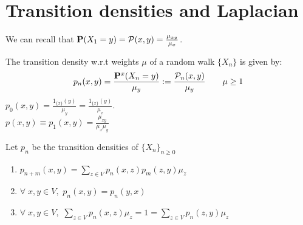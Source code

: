 \documentclass[main]{subfiles}
\begin{document}


\section{Transition densities and Laplacian}
We can recall that $\P(X_1=y) = \mathcal{P}(x,y) = \frac{\mu_{xy}}{\mu_x}$.

\begin{definition}
    The transition density w.r.t weights $\mu$ of a random walk $\{X_n\}$ is given by:
    $$p_n(x,y) = \frac{\P^x(X_n = y)}{\mu_y}:=\frac{\mathcal{P}_n(x,y)}{\mu_y} \hspace{2em} \mu \geq 1$$
    $p_0(x,y) = \frac{1_{\{x\}}(y)}{\mu_y} = \frac{1_{\{x\}}(y)}{\mu_x}$.\\
    $p(x,y) \equiv p_1(x,y) = \frac{\mu_{xy}}{\mu_x\mu_y} $
\end{definition}

\begin{lemma}
    Let $p_n$ be the transition densities of $\{X_n\}_{n \geq 0}$
    \begin{enumerate}
        \item $p_{n+m}(x, y) = \sum_{z \in V} p_n(x, z)p_m(z, y)\mu_z$
        \item $\forall\;x,y \in V,$ $p_n(x, y) = p_n(y, x)$
        \item $\forall\;x,y \in V,$ $\sum_{z \in V} p_n(x, z)\mu_z = 1 = \sum_{z \in V} p_n(z, y)\mu_z$
    \end{enumerate}
    \label{lem:transitionbasics}
\end{lemma}
\end{document}
